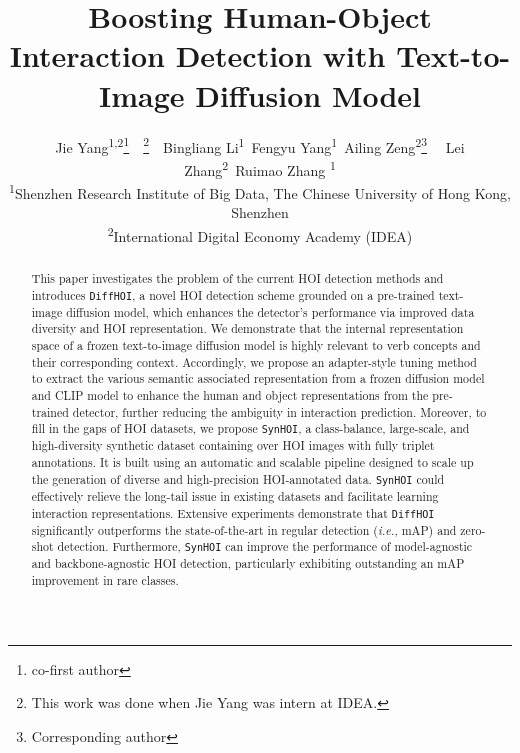 \documentclass{article}
\title{Boosting Human-Object Interaction Detection with Text-to-Image Diffusion Model}
\author{
  Jie Yang\textsuperscript{\rm 1,2}\thanks{co-first author}~~\thanks{This work was done when Jie Yang was intern at IDEA.}~~Bingliang Li\textsuperscript{\rm 1}~Fengyu Yang\textsuperscript{\rm 1}~Ailing Zeng\textsuperscript{\rm 2}\thanks{Corresponding author}~~ Lei Zhang\textsuperscript{\rm 2}~Ruimao Zhang \textsuperscript{\rm 1} \quad \\ 
  \textsuperscript{\rm 1}Shenzhen Research Institute of Big Data, The Chinese University of Hong Kong, Shenzhen  \quad \\ 
  \textsuperscript{\rm 2}International Digital Economy Academy (IDEA)
}
\begin{document}
\maketitle


\begin{abstract}
































This paper investigates the problem of the current HOI detection methods and introduces \texttt{DiffHOI}, a novel HOI detection scheme grounded on a pre-trained text-image diffusion model, which enhances the detector's performance via improved data diversity and HOI representation. 
We demonstrate that the internal representation space of a frozen text-to-image diffusion model is highly relevant to verb concepts and their corresponding context.
Accordingly, we propose an adapter-style tuning method to extract the various semantic associated representation from a frozen diffusion model and CLIP model to enhance the human and object representations from the pre-trained detector, further reducing the ambiguity in interaction prediction. 
Moreover, to fill in the gaps of HOI datasets, we propose \texttt{SynHOI}, a class-balance, large-scale, and high-diversity synthetic dataset containing over  HOI images with fully triplet annotations. It is built using an automatic and scalable pipeline designed to scale up the generation of diverse and high-precision HOI-annotated data. 
\texttt{SynHOI} could effectively relieve the long-tail issue in existing datasets and facilitate learning interaction representations. 
Extensive experiments demonstrate that \texttt{DiffHOI} significantly outperforms the state-of-the-art in regular detection (\textit{i.e.},  mAP) and zero-shot detection. Furthermore, \texttt{SynHOI} can improve the performance of
model-agnostic and backbone-agnostic HOI detection, particularly exhibiting
outstanding an  mAP improvement in rare classes.
 

\end{abstract}
\end{document}
